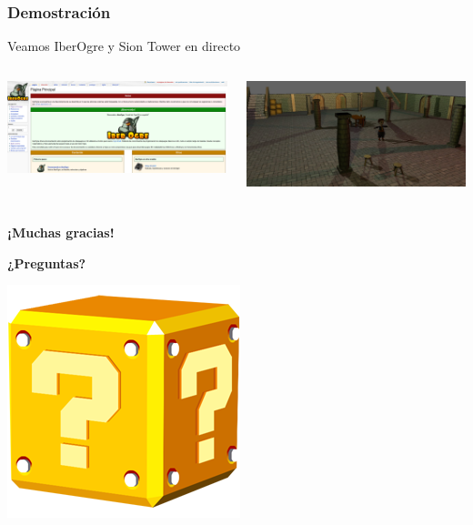\documentclass[green]{beamer}
\begin{document}
\begin{frame}
\transdissolve
    \frametitle{Demostración}
    
    \begin{center}
	Veamos IberOgre y Sion Tower en directo
    \end{center}
    
    
    \begin{columns}[c]
    \column{175pt}
        
	\begin{center}
	    \includegraphics[scale=0.09]{img/captura-iberogre.png}
	\end{center}

    \column{175pt}
        
	\begin{center}
	    \includegraphics[scale=0.1]{img/captura-siontower.jpg}
	\end{center}
    \end{columns} 
\end{frame}

\begin{frame}
\transdissolve
    \frametitle{}
    
    \begin{center}
	\huge{\textbf{¡Muchas gracias!}}
    \end{center}
    
    \begin{center}
	\textbf{¿Preguntas?}
    \end{center}
    
    \begin{center}
	    \includegraphics[scale=0.25]{img/pregunta.png}
    \end{center}
    
\end{frame}
\end{document}
